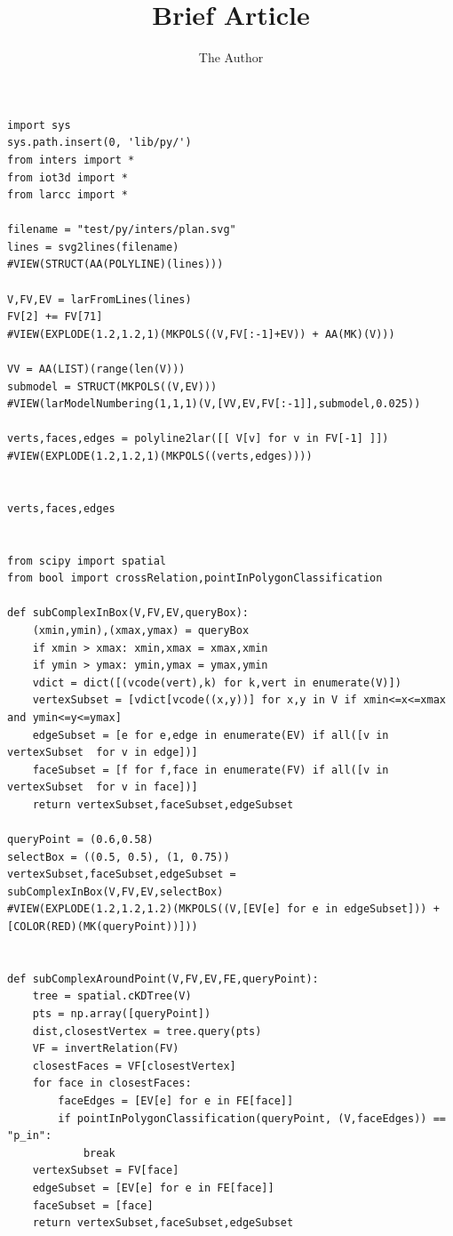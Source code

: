 \documentclass[11pt, oneside]{article}   	%
\title{Brief Article}
\author{The Author}
\begin{document}
\maketitle


\begin{verbatim}
import sys
sys.path.insert(0, 'lib/py/')
from inters import *
from iot3d import *
from larcc import *

filename = "test/py/inters/plan.svg"
lines = svg2lines(filename)
#VIEW(STRUCT(AA(POLYLINE)(lines)))
    
V,FV,EV = larFromLines(lines)
FV[2] += FV[71]
#VIEW(EXPLODE(1.2,1.2,1)(MKPOLS((V,FV[:-1]+EV)) + AA(MK)(V)))

VV = AA(LIST)(range(len(V)))
submodel = STRUCT(MKPOLS((V,EV)))
#VIEW(larModelNumbering(1,1,1)(V,[VV,EV,FV[:-1]],submodel,0.025))

verts,faces,edges = polyline2lar([[ V[v] for v in FV[-1] ]])
#VIEW(EXPLODE(1.2,1.2,1)(MKPOLS((verts,edges))))


verts,faces,edges


from scipy import spatial
from bool import crossRelation,pointInPolygonClassification

def subComplexInBox(V,FV,EV,queryBox):
    (xmin,ymin),(xmax,ymax) = queryBox
    if xmin > xmax: xmin,xmax = xmax,xmin
    if ymin > ymax: ymin,ymax = ymax,ymin
    vdict = dict([(vcode(vert),k) for k,vert in enumerate(V)])
    vertexSubset = [vdict[vcode((x,y))] for x,y in V if xmin<=x<=xmax and ymin<=y<=ymax]
    edgeSubset = [e for e,edge in enumerate(EV) if all([v in vertexSubset  for v in edge])]    
    faceSubset = [f for f,face in enumerate(FV) if all([v in vertexSubset  for v in face])]
    return vertexSubset,faceSubset,edgeSubset

queryPoint = (0.6,0.58)
selectBox = ((0.5, 0.5), (1, 0.75))
vertexSubset,faceSubset,edgeSubset = subComplexInBox(V,FV,EV,selectBox)
#VIEW(EXPLODE(1.2,1.2,1.2)(MKPOLS((V,[EV[e] for e in edgeSubset])) + [COLOR(RED)(MK(queryPoint))]))

   
def subComplexAroundPoint(V,FV,EV,FE,queryPoint):
    tree = spatial.cKDTree(V)
    pts = np.array([queryPoint])
    dist,closestVertex = tree.query(pts)
    VF = invertRelation(FV)
    closestFaces = VF[closestVertex]
    for face in closestFaces:
    	faceEdges = [EV[e] for e in FE[face]]
        if pointInPolygonClassification(queryPoint, (V,faceEdges)) == "p_in":
            break
    vertexSubset = FV[face]
    edgeSubset = [EV[e] for e in FE[face]]
    faceSubset = [face]
    return vertexSubset,faceSubset,edgeSubset
    

\end{verbatim}
\end{document}
